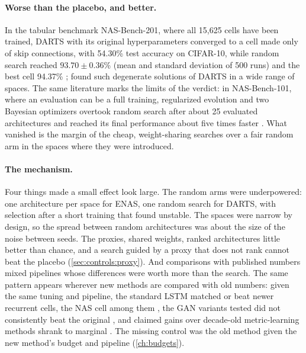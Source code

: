 \begin{refsection}
\paragraph{Worse than the placebo, and better.} In the tabular benchmark NAS-Bench-201, where all 15{,}625 cells have been trained, DARTS with its original hyperparameters converged to a cell made only of skip connections, with 54.30\% test accuracy on CIFAR-10, while random search reached $93.70\pm0.36$\% (mean and standard deviation of 500 runs) and the best cell 94.37\% \parencite{DongYang2020}; \textcite{ZelaEtAl2020} found such degenerate solutions of DARTS in a wide range of spaces. The same literature marks the limits of the verdict: in NAS-Bench-101, where an evaluation can be a full training, regularized evolution and two Bayesian optimizers overtook random search after about 25 evaluated architectures and reached its final performance about five times faster \parencite{YingEtAl2019}. What vanished is the margin of the cheap, weight-sharing searches over a fair random arm in the spaces where they were introduced.

\paragraph{The mechanism.} Four things made a small effect look large. The random arms were underpowered: one architecture per space for ENAS, one random search for DARTS, with selection after a short training that \textcite{LiTalwalkar2019} found unstable. The spaces were narrow by design, so the spread between random architectures was about the size of the noise between seeds. The proxies, shared weights, ranked architectures little better than chance, and a search guided by a proxy that does not rank cannot beat the placebo (\cref{sec:controls:proxy}). And comparisons with published numbers mixed pipelines whose differences were worth more than the search. The same pattern appears wherever new methods are compared with old numbers: given the same tuning and pipeline, the standard LSTM matched or beat newer recurrent cells, the NAS cell among them \parencite{MelisDyerBlunsom2018}, the GAN variants tested did not consistently beat the original \parencite{LucicEtAl2018}, and claimed gains over decade-old metric-learning methods shrank to marginal \parencite{MusgraveBelongieLim2020}. The missing control was the old method given the new method's budget and pipeline (\cref{ch:budgets}).


\end{refsection}
